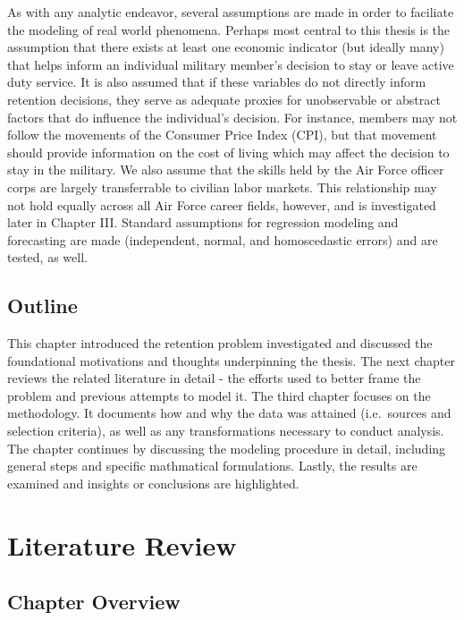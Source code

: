 \documentclass[12pt,letterpaper,toc=flat,oneside]{report}
\theoremstyle{definition}
\theoremstyle{definition}
\theoremstyle{definition}
\theoremstyle{remark}
\begin{document}
As with any analytic endeavor, several assumptions are made in order to
faciliate the modeling of real world phenomena. Perhaps most central to
this thesis is the assumption that there exists at least one economic
indicator (but ideally many) that helps inform an individual military
member's decision to stay or leave active duty service. It is also
assumed that if these variables do not directly inform retention
decisions, they serve as adequate proxies for unobservable or abstract
factors that do influence the individual's decision. For instance,
members may not follow the movements of the Consumer Price Index (CPI),
but that movement should provide information on the cost of living which
may affect the decision to stay in the military. We also assume that the
skills held by the Air Force officer corps are largely transferrable to
civilian labor markets. This relationship may not hold equally across
all Air Force career fields, however, and is investigated later in
Chapter III. Standard assumptions for regression modeling and
forecasting are made (independent, normal, and homoscedastic errors) and
are tested, as well.

\hypertarget{outline}{%
\section{Outline}\label{outline}}

This chapter introduced the retention problem investigated and discussed
the foundational motivations and thoughts underpinning the thesis. The
next chapter reviews the related literature in detail - the efforts used
to better frame the problem and previous attempts to model it. The third
chapter focuses on the methodology. It documents how and why the data
was attained (i.e.~sources and selection criteria), as well as any
transformations necessary to conduct analysis. The chapter continues by
discussing the modeling procedure in detail, including general steps and
specific mathmatical formulations. Lastly, the results are examined and
insights or conclusions are highlighted.

\newpage

\hypertarget{literature-review}{%
\chapter{Literature Review}\label{literature-review}}

\hypertarget{chapter-overview}{%
\section{Chapter Overview}\label{chapter-overview}}
\end{document}
